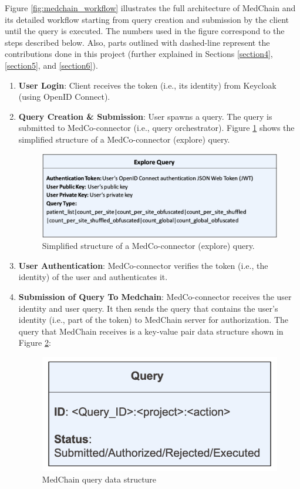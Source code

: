 Figure \ref{fig:medchain_workflow} illustrates the full architecture of MedChain and its detailed workflow starting from query creation and submission by the client until the query is executed. The numbers used in the figure correspond to the steps described below. Also, parts outlined with dashed-line represent the contributions done in this project (further explained in Sections \ref{section4}, \ref{section5}, and \ref{section6}).


\begin{enumerate}
    \item \textbf{User Login}: Client receives the token (i.e., its identity) from Keycloak (using OpenID Connect).
    
    \item \textbf{Query Creation \& Submission}: User spawns a query. The query is submitted to MedCo-connector (i.e., query orchestrator). Figure \ref{fig:medco_query} shows the simplified structure of a MedCo-connector (explore) query. 
  \begin{figure}[htbp] 
        \centering \includegraphics[width=0.9\columnwidth]{Images/medco_query.png}
        \caption{\label{fig:medco_query} 
         Simplified structure of a MedCo-connector (explore) query.
        }
\end{figure}
    
    \item \textbf{User Authentication}: MedCo-connector verifies the token (i.e., the identity) of the user and authenticates it. 
    
    \item \textbf{Submission of Query To Medchain}: MedCo-connector receives the user identity and user query. It then sends the query that contains the user’s identity (i.e., part of the token) to MedChain server for authorization. The query that MedChain receives is a key-value pair data structure shown in Figure \ref{fig:medchain_query}:
\begin{figure}[htbp] 
        \centering \includegraphics[width=0.5\columnwidth]{Images/query.png}
        \caption{\label{fig:medchain_query} 
         MedChain query data structure
        }
\end{figure}


\end{enumerate}
